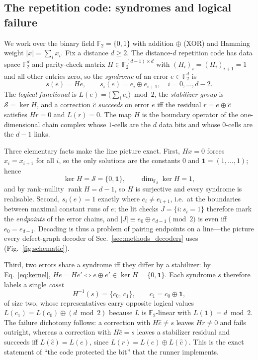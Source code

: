 \documentclass[reprint,aps,prxquantum,amsmath,amssymb,floatfix,nofootinbib,longbibliography]{revtex4-2}
\theoremstyle{definition}
\theoremstyle{remark}
\theoremstyle{plain}
\newcommand{\F}{\mathbb{F}}
\newcommand{\abs}[1]{\left\lvert #1 \right\rvert}
\begin{document}
\subsection{The repetition code: syndromes and logical failure}
\label{sec:theory_code}

We work over the binary field $\F_2=\{0,1\}$ with addition $\oplus$ (XOR) and Hamming weight $\abs{x}=\sum_i x_i$. Fix a distance $d\ge 2$. The distance-$d$ repetition code has data space $\F_2^d$ and parity-check matrix $H\in\F_2^{(d-1)\times d}$ with $(H_i)_i=(H_i)_{i+1}=1$ and all other entries zero, so the \emph{syndrome} of an error $e\in\F_2^d$ is
\begin{equation}
  s(e)=He, \qquad s_i(e)=e_i\oplus e_{i+1}, \quad i=0,\dots,d-2.
  \label{eq:syndrome}
\end{equation}
The \emph{logical functional} is $L(e)=\bigl(\sum_i e_i\bigr)\bmod 2$, the \emph{stabilizer group} is $\mathcal S=\ker H$, and a correction $\hat c$ \emph{succeeds} on error $e$ iff the residual $r=e\oplus\hat c$ satisfies $Hr=0$ and $L(r)=0$. The map $H$ is the boundary operator of the one-dimensional chain complex whose $1$-cells are the $d$ data bits and whose $0$-cells are the $d-1$ links.

Three elementary facts make the line picture exact. First, $Hx=0$ forces $x_i=x_{i+1}$ for all $i$, so the only solutions are the constants $0$ and $\mathbf 1=(1,\dots,1)$; hence
\begin{equation}
  \ker H=\mathcal S=\{0,\mathbf 1\}, \qquad \dim_{\F_2}\ker H=1,
  \label{eq:kernel}
\end{equation}
and by rank--nullity $\operatorname{rank}H=d-1$, so $H$ is surjective and every syndrome is realisable. Second, $s_i(e)=1$ exactly where $e_i\neq e_{i+1}$, i.e.\ at the boundaries between maximal constant runs of $e$; the lit checks $J=\{i:s_i=1\}$ therefore mark the \emph{endpoints} of the error chains, and $\abs J\equiv e_0\oplus e_{d-1}\pmod 2$ is even iff $e_0=e_{d-1}$. Decoding is thus a problem of pairing endpoints on a line---the picture every defect-graph decoder of Sec.~\ref{sec:methods_decoders} uses (Fig.~\ref{fig:schematic}).

Third, two errors share a syndrome iff they differ by a stabilizer: by Eq.~\eqref{eq:kernel}, $He=He'\iff e\oplus e'\in\ker H=\{0,\mathbf 1\}$. Each syndrome $s$ therefore labels a single \emph{coset}
\begin{equation}
  H^{-1}(s)=\{c_0,\,c_1\}, \qquad c_1=c_0\oplus\mathbf 1,
  \label{eq:coset}
\end{equation}
of size two, whose representatives carry opposite logical values $L(c_1)=L(c_0)\oplus(d\bmod 2)$ because $L$ is $\F_2$-linear with $L(\mathbf 1)=d\bmod 2$. The failure dichotomy follows: a correction with $H\hat c\neq s$ leaves $Hr\neq 0$ and fails outright, whereas a correction with $H\hat c=s$ leaves a stabilizer residual and succeeds iff $L(\hat c)=L(e)$, since $L(r)=L(e)\oplus L(\hat c)$. This is the exact statement of ``the code protected the bit'' that the runner implements.
\end{document}
